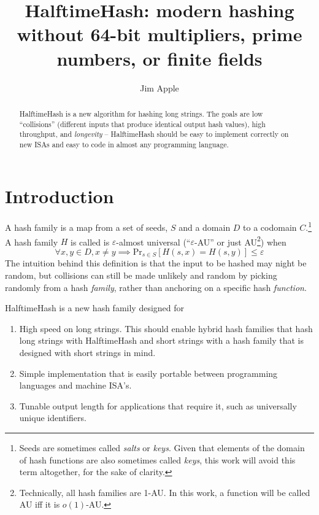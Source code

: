 \documentclass[sigconf, nonacm]{acmart}
\title{HalftimeHash: modern hashing without 64-bit multipliers, prime numbers, or finite fields}
\author{Jim Apple}
\begin{document}
\thispagestyle{empty}

\begin{abstract}
HalftimeHash is a new algorithm for hashing long strings.
The goals are low ``collisions'' (different inputs that produce identical output hash values), high throughput, and {\em longevity} -- HalftimeHash should be easy to implement correctly on new ISAs and easy to code in almost any programming language.
\end{abstract}

\maketitle

\section{Introduction}
A hash family is a map from a set of seeds, $S$ and a domain $D$ to a codomain $C$.\footnote{Seeds are sometimes called {\em salts} or {\em keys}. Given that elements of the domain of hash functions are also sometimes called {\em keys}, this work will avoid this term altogether, for the sake of clarity.}
A hash family $H$ is called is $\varepsilon$-almost universal (``$\varepsilon$-AU'' or just AU\footnote{Technically, all hash families are 1-AU. In this work, a function will be called AU iff it is $o(1)$-AU.}) when
\[\forall x,y \in D, x \neq y \implies \mathrm{Pr}_{s \in S}[H(s, x) = H(s, y)] \leq \varepsilon\]
The intuition behind this definition is that the input to be hashed may night be random, but collisions can still be made unlikely and random by picking randomly from a hash {\em family}, rather than anchoring on a specific hash {\em function}.

HalftimeHash is a new hash family designed for

\begin{enumerate}
\item High speed on long strings.
  This should enable hybrid hash families that hash long strings with HalftimeHash and short strings with a hash family that is designed with short strings in mind. \cite{siphash,umash}
\item Simple implementation that is easily portable between programming languages and machine ISA's.
\item Tunable output length for applications that require it, such as universally unique identifiers.
\end{enumerate}
\end{document}
